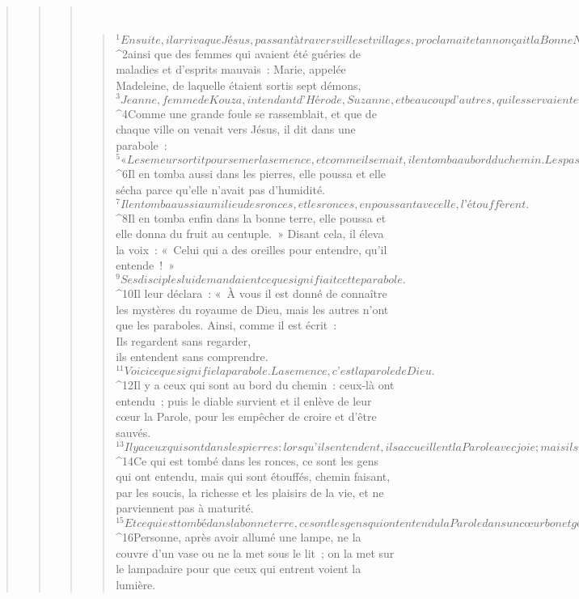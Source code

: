 \begin{verse}
\begin{verse}
\begin{verse}
         
      \bchapter{}
      \begin{verse}
${}^{1}Ensuite, il arriva que Jésus, passant à travers villes et villages, proclamait et annonçait la Bonne Nouvelle du règne de Dieu. Les Douze l’accompagnaient, 
${}^{2}ainsi que des femmes qui avaient été guéries de maladies et d’esprits mauvais : Marie, appelée Madeleine, de laquelle étaient sortis sept démons, 
${}^{3}Jeanne, femme de Kouza, intendant d’Hérode, Suzanne, et beaucoup d’autres, qui les servaient en prenant sur leurs ressources.
      
         
${}^{4}Comme une grande foule se rassemblait, et que de chaque ville on venait vers Jésus, il dit dans une parabole : 
${}^{5}« Le semeur sortit pour semer la semence, et comme il semait, il en tomba au bord du chemin. Les passants la piétinèrent, et les oiseaux du ciel mangèrent tout. 
${}^{6}Il en tomba aussi dans les pierres, elle poussa et elle sécha parce qu’elle n’avait pas d’humidité. 
${}^{7}Il en tomba aussi au milieu des ronces, et les ronces, en poussant avec elle, l’étouffèrent. 
${}^{8}Il en tomba enfin dans la bonne terre, elle poussa et elle donna du fruit au centuple. » Disant cela, il éleva la voix : « Celui qui a des oreilles pour entendre, qu’il entende ! »
${}^{9}Ses disciples lui demandaient ce que signifiait cette parabole. 
${}^{10}Il leur déclara : « À vous il est donné de connaître les mystères du royaume de Dieu, mais les autres n’ont que les paraboles. Ainsi, comme il est écrit :
        \\Ils regardent sans regarder,
        \\ils entendent sans comprendre.
${}^{11}Voici ce que signifie la parabole. La semence, c’est la parole de Dieu. 
${}^{12}Il y a ceux qui sont au bord du chemin : ceux-là ont entendu ; puis le diable survient et il enlève de leur cœur la Parole, pour les empêcher de croire et d’être sauvés. 
${}^{13}Il y a ceux qui sont dans les pierres : lorsqu’ils entendent, ils accueillent la Parole avec joie ; mais ils n’ont pas de racines, ils croient pour un moment et, au moment de l’épreuve, ils abandonnent. 
${}^{14}Ce qui est tombé dans les ronces, ce sont les gens qui ont entendu, mais qui sont étouffés, chemin faisant, par les soucis, la richesse et les plaisirs de la vie, et ne parviennent pas à maturité. 
${}^{15}Et ce qui est tombé dans la bonne terre, ce sont les gens qui ont entendu la Parole dans un cœur bon et généreux, qui la retiennent et portent du fruit par leur persévérance.
${}^{16}Personne, après avoir allumé une lampe, ne la couvre d’un vase ou ne la met sous le lit ; on la met sur le lampadaire pour que ceux qui entrent voient la lumière. 

\end{verse}
\end{verse}
\end{verse}
\end{verse}
